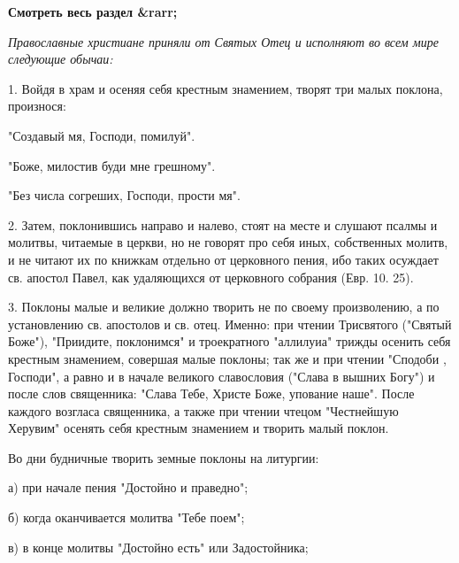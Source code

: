 


\bfseries Смотреть весь раздел &rarr;\normalfont{} 

 





\itshape Православные христиане приняли от Святых Отец и исполняют во всем мире следующие обычаи: \normalfont{}



1. Войдя в храм и осеняя себя крестным знамением, творят три малых поклона, произнося: \bfseries 



"Создавый мя, Господи, помилуй". 



"Боже, милостив буди мне грешному". 



"Без числа согреших, Господи, прости мя". \normalfont{}



2. Затем, поклонившись направо и налево, стоят на месте и слушают псалмы и молитвы, читаемые в церкви, но не говорят про себя иных, собственных молитв, и не читают их по книжкам отдельно от церковного пения, ибо таких осуждает св. апостол Павел, как удаляющихся от церковного собрания (Евр. 10. 25). 



3. Поклоны малые и великие должно творить не по своему произволению, а по установлению св. апостолов и св. отец. Именно: при чтении Трисвятого ("Святый Боже"), "Приидите, поклонимся" и троекратного "аллилуиа" трижды осенить себя крестным знамением, совершая малые поклоны; так же и при чтении "Сподоби , Господи", а равно и в начале великого славословия ("Слава в вышних Богу") и после слов священника: "Слава Тебе, Христе Боже, упование наше". После каждого возгласа священника, а также при чтении чтецом "Честнейшую Херувим" осенять себя крестным знамением и творить малый поклон. 



Во дни будничные творить земные поклоны на литургии:

а)  при начале пения "Достойно и праведно"; 

б) когда оканчивается молитва "Тебе поем"; 

в) в конце молитвы "Достойно есть" или Задостойника;

